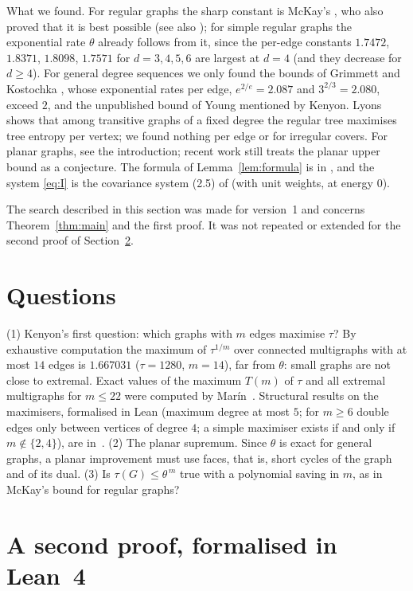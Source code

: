 \documentclass[11pt]{amsart}
\theoremstyle{plain}
\theoremstyle{remark}
\newcommand{\tht}{\theta}
\begin{document}
What we found. For regular graphs the sharp constant is McKay's \cite{McKay}, who also proved that it is best
possible \cite[Theorem~4.3]{McKay} (see also \cite{GIKM,ChungYau}); for simple regular graphs the exponential rate $\tht$ already follows from it,
since the per-edge constants $1.7472$, $1.8371$, $1.8098$, $1.7571$ for $d=3,4,5,6$ are largest at $d=4$ (and they
decrease for $d\ge4$). For general
degree sequences we only found the bounds of Grimmett \cite{Grimmett} and Kostochka \cite{Kostochka}, whose
exponential rates per edge, $e^{2/e}=2.087$ and $3^{2/3}=2.080$, exceed $2$, and the unpublished bound of Young
mentioned by Kenyon. Lyons \cite{Lyons} shows that among transitive graphs
of a fixed degree the regular tree maximises tree entropy per vertex; we found nothing per edge or for irregular
covers. For planar graphs, see the introduction; recent work \cite{Burton,CK25} still treats the planar upper
bound as a conjecture. The formula of Lemma~\ref{lem:formula} is in \cite{BBGSS}, and the system \eqref{eq:I}
is the covariance system (2.5) of \cite{Watanabe} (with unit weights, at energy $0$).

The search described in this section was made for version~1 and concerns Theorem~\ref{thm:main} and the first
proof. It was not repeated or extended for the second proof of Section~\ref{sec:second}.

\section{Questions}

\textup{(1)} Kenyon's first question: which graphs with $m$ edges maximise $\tau$? By exhaustive computation the
maximum of $\tau^{1/m}$ over connected multigraphs with at most $14$ edges is $1.667031$ ($\tau=1280$, $m=14$), far
from $\tht$: small graphs are not close to extremal. Exact values of the maximum $T(m)$ of $\tau$ and all extremal
multigraphs for $m\le22$ were computed by Mar\'in~\cite{Marin}. Structural results on the maximisers, formalised in
Lean (maximum degree at most $5$; for $m\ge6$ double edges only between vertices of degree $4$; a simple maximiser
exists if and only if $m\notin\{2,4\}$), are in~\cite{M3}.
\textup{(2)} The planar supremum. Since $\tht$ is exact for general graphs, a planar improvement must use faces,
that is, short cycles of the graph and of its dual. \textup{(3)} Is $\tau(G)\le\tht^{\,m}$ true with a
polynomial saving in $m$, as in McKay's bound for regular graphs?

\section{A second proof, formalised in Lean~4}\label{sec:second}
\end{document}
